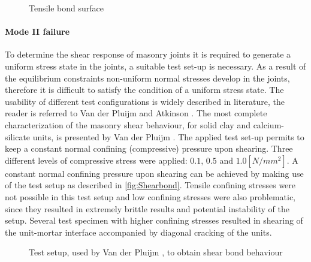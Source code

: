 \begin{figure}[!htb]
    \centering
     \hspace{3em}
    \caption{Tensile bond surface \cite{lourenco1996}}
    \label{fig:Netbond}
\end{figure}

\paragraph{Mode II failure}
To determine the shear response of masonry joints it is required to generate a uniform stress state in the joints, a suitable test set-up is necessary. As a result of the equilibrium constraints non-uniform normal stresses develop in the joints, therefore it is difficult to satisfy the condition of a uniform stress state. The usability of different test configurations is widely described in literature, the reader is referred to Van der Pluijm and Atkinson \cite{pluijm1993, Atkinson1989}. The most complete characterization of the masonry shear behaviour, for solid clay and calcium-silicate units, is presented by Van der Pluijm \cite{pluijm1993}. The applied test set-up permits to keep a constant normal confining (compressive) pressure upon shearing. Three different levels of compressive stress were applied: $0.1$, $0.5$ and $1.0 [N/mm^2]$. A constant normal confining pressure upon shearing can be achieved by making use of the test setup as described in \autoref{fig:Shearbond}. Tensile confining stresses were not possible in this test setup and low confining stresses were also problematic, since they resulted in extremely brittle results and potential instability of the setup. Several test specimen with higher confining stresses resulted in shearing of the unit-mortar interface accompanied by diagonal cracking of the units.

\begin{figure}[!htb]
    \centering
     \hspace{3em}
    \caption{Test setup, used by Van der Pluijm \cite{pluijm1993}, to obtain shear bond behaviour \cite{lourenco1996}}
    \label{fig:Shearbond}
\end{figure}

